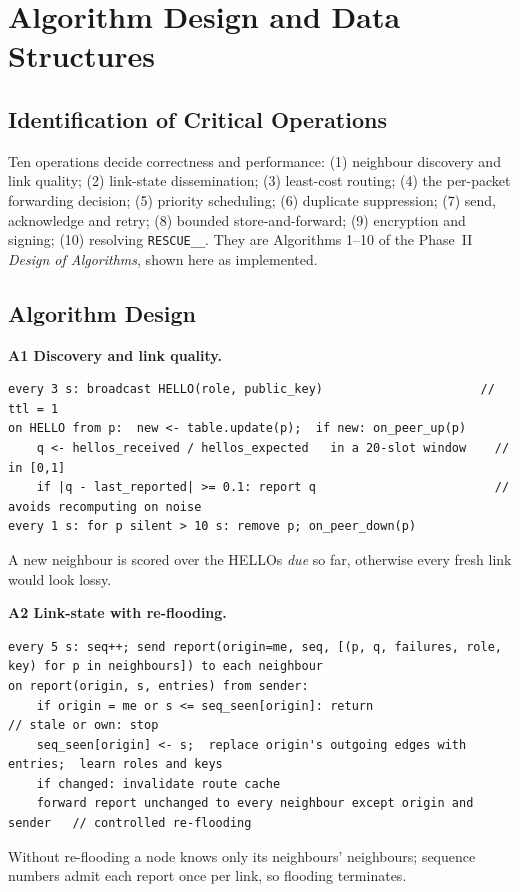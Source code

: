 \section{Algorithm Design and Data Structures}
\label{ch:alg}

\subsection{Identification of Critical Operations}
Ten operations decide correctness and performance: (1) neighbour discovery and link quality; (2) link-state dissemination; (3) least-cost routing; (4) the per-packet forwarding decision; (5) priority scheduling; (6) duplicate suppression; (7) send, acknowledge and retry; (8) bounded store-and-forward; (9) encryption and signing; (10) resolving \texttt{RESCUE\_\_}. They are Algorithms 1--10 of the Phase~II \emph{Design of Algorithms}, shown here as implemented.
\subsection{Algorithm Design}
\label{sec:algdesign}
\noindent\textbf{A1 Discovery and link quality.}
\begin{lstlisting}
every 3 s: broadcast HELLO(role, public_key)                      // ttl = 1
on HELLO from p:  new <- table.update(p);  if new: on_peer_up(p)
    q <- hellos_received / hellos_expected   in a 20-slot window    // in [0,1]
    if |q - last_reported| >= 0.1: report q                         // avoids recomputing on noise
every 1 s: for p silent > 10 s: remove p; on_peer_down(p)
\end{lstlisting}
A new neighbour is scored over the HELLOs \emph{due} so far, otherwise every fresh link would look lossy.

\noindent\textbf{A2 Link-state with re-flooding.}
\begin{lstlisting}
every 5 s: seq++; send report(origin=me, seq, [(p, q, failures, role, key) for p in neighbours]) to each neighbour
on report(origin, s, entries) from sender:
    if origin = me or s <= seq_seen[origin]: return                  // stale or own: stop
    seq_seen[origin] <- s;  replace origin's outgoing edges with entries;  learn roles and keys
    if changed: invalidate route cache
    forward report unchanged to every neighbour except origin and sender   // controlled re-flooding
\end{lstlisting}
Without re-flooding a node knows only its neighbours' neighbours; sequence numbers admit each report once per link, so flooding terminates.

